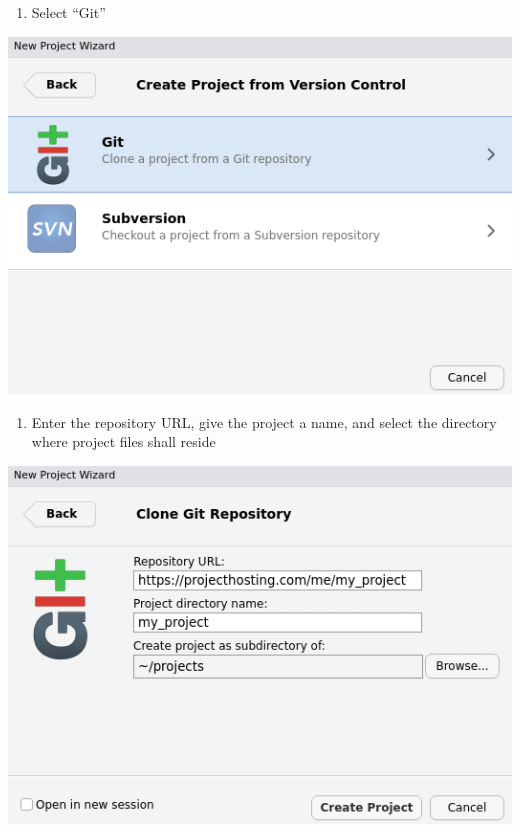 \documentclass[
]{book}
\providecommand{\tightlist}{%
  \setlength{\itemsep}{0pt}\setlength{\parskip}{0pt}}
\begin{document}
\begin{enumerate}
\def\labelenumi{\arabic{enumi}.}
\setcounter{enumi}{2}
\tightlist
\item
  Select ``Git''
\end{enumerate}

\includegraphics{images/02-newprojectgit_2.png}

\begin{enumerate}
\def\labelenumi{\arabic{enumi}.}
\setcounter{enumi}{3}
\tightlist
\item
  Enter the repository URL, give the project a name, and select the directory where project files shall reside
\end{enumerate}

\includegraphics{images/02-newprojectgit_3.png}
\end{document}
